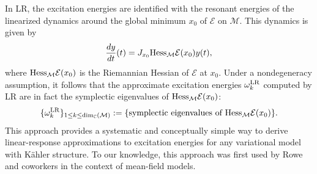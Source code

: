 \documentclass[11pt]{article}
\def\C{{\mathbb C}}
\begin{document}
In LR, the excitation energies are identified with the resonant energies of the linearized dynamics around the global minimum $x_0$ of $\mathcal E$ on $\mathcal M$. This dynamics is given by
\begin{equation}  \label{eq:linear_response_11}
    {\frac{dy}{dt}(t) = J_{x_0} {\rm Hess}_{\mathcal M} \mathcal E(x_0) y(t)},
\end{equation}
where ${\rm Hess}_{\mathcal M} \mathcal E(x_0)$ is the Riemannian Hessian of $\mathcal E$ at $x_0$. Under a nondegeneracy assumption, it follows that the approximate excitation energies $\omega^{\rm LR}_k$ computed by LR are in fact the symplectic eigenvalues of ${\rm Hess}_{\mathcal M} \mathcal E(x_0)$:
\begin{equation}\label{eq:linear_response_1}
    \{\omega_k^{\rm LR}\}_{1 \le k \le \dim_{\C}(\mathcal M)} := \{ \mbox{symplectic eigenvalues of }  {\rm Hess}_{\mathcal M} \mathcal E(x_0) \}.
\end{equation}
This approach provides a systematic and conceptually simple way to derive linear-response approximations to excitation energies for any variational model with K\"ahler structure. To our knowledge, this approach was first used by Rowe and coworkers\supercite{Rowe1980} in the context of mean-field models.

\medskip
\end{document}
